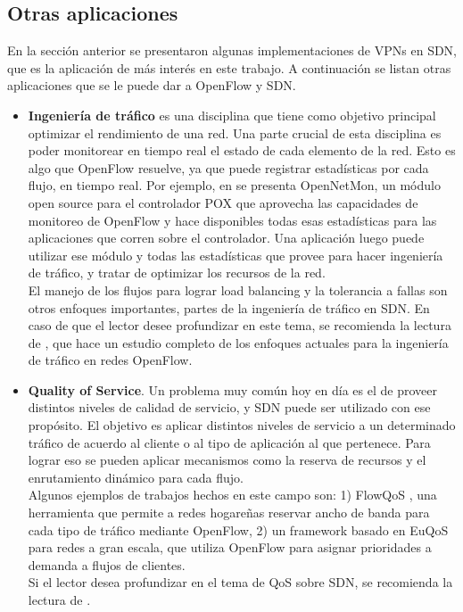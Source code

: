 \subsection{Otras aplicaciones}
En la sección anterior se presentaron algunas implementaciones de VPNs en SDN, que es la aplicación de más interés en este trabajo. A continuación se listan otras aplicaciones que se le puede dar a OpenFlow y SDN.
\begin{itemize}
	\item \textbf{Ingeniería de tráfico} es una disciplina que tiene como objetivo principal optimizar el rendimiento de una red. Una parte crucial de esta disciplina es poder monitorear en tiempo real el estado de cada elemento de la red. Esto es algo que OpenFlow resuelve, ya que puede registrar estadísticas por cada flujo, en tiempo real. Por ejemplo, en \cite{opennetmon} se presenta OpenNetMon, un módulo open source para el controlador POX que aprovecha las capacidades de monitoreo de OpenFlow y hace disponibles todas esas estadísticas para las aplicaciones que corren sobre el controlador. Una aplicación luego puede utilizar ese módulo y todas las estadísticas que provee para hacer ingeniería de tráfico, y tratar de optimizar los recursos de la red. \\
	El manejo de los flujos para lograr load balancing y la tolerancia a fallas son otros enfoques importantes, partes de la ingeniería de tráfico en SDN. En caso de que el lector desee profundizar en este tema, se recomienda la lectura de \cite{roadmap-sdn-te}, que hace un estudio completo de los enfoques actuales para la ingeniería de tráfico en redes OpenFlow.
	\item \textbf{Quality of Service}. Un problema muy común hoy en día es el de proveer distintos niveles de calidad de servicio, y SDN puede ser utilizado con ese propósito. El objetivo es aplicar distintos niveles de servicio a un determinado tráfico de acuerdo al cliente o al tipo de aplicación al que pertenece. Para lograr eso se pueden aplicar mecanismos como la reserva de recursos y el enrutamiento dinámico para cada flujo. \\
	Algunos ejemplos de trabajos hechos en este campo son: 1) FlowQoS \cite{flowqos}, una herramienta que permite a redes hogareñas reservar ancho de banda para cada tipo de tráfico mediante OpenFlow, 2) un framework basado en EuQoS \cite{euqos} para redes a gran escala, que utiliza OpenFlow para asignar prioridades a demanda a flujos de clientes. \\
	Si el lector desea profundizar en el tema de QoS sobre SDN, se recomienda la lectura de \cite{survey-sdn-qos}.

\end{itemize}
